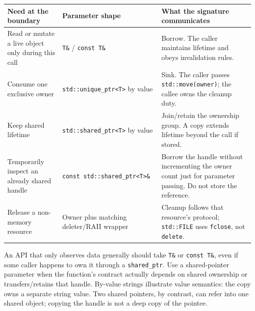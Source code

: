 {\def\LTcaptype{none} %
\begin{longtable}[]{@{}
  >{\raggedright\arraybackslash}p{}
  >{\raggedright\arraybackslash}p{}
  >{\raggedright\arraybackslash}p{}@{}}
\toprule\noalign{}
\begin{minipage}[b]{\linewidth}\raggedright
Need at the boundary
\end{minipage} & \begin{minipage}[b]{\linewidth}\raggedright
Parameter shape
\end{minipage} & \begin{minipage}[b]{\linewidth}\raggedright
What the signature communicates
\end{minipage} \\
\midrule\noalign{}
\endhead
\bottomrule\noalign{}
\endlastfoot
Read or mutate a live object only during this call & \texttt{T\&} / \texttt{const\ T\&} & Borrow. The caller maintains lifetime and obeys invalidation rules. \\
Consume one exclusive owner & \texttt{std::unique\_ptr\textless{}T\textgreater{}} by value & Sink. The caller passes \texttt{std::move(owner)}; the callee owns the cleanup duty. \\
Keep shared lifetime & \texttt{std::shared\_ptr\textless{}T\textgreater{}} by value & Join/retain the ownership group. A copy extends lifetime beyond the call if stored. \\
Temporarily inspect an already shared handle & \texttt{const\ std::shared\_ptr\textless{}T\textgreater{}\&} & Borrow the handle without incrementing the owner count just for parameter passing. Do not store the reference. \\
Release a non-memory resource & Owner plus matching deleter/RAII wrapper & Cleanup follows that resource's protocol; \texttt{std::FILE} uses \texttt{fclose}, not \texttt{delete}. \\
\end{longtable}
}

An API that only observes data generally should take \texttt{T\&} or \texttt{const\ T\&}, even if some caller happens to own it through a \texttt{shared\_ptr}. Use a shared-pointer parameter when the function's contract actually depends on shared ownership or transfers/retains that handle. By-value strings illustrate value semantics: the copy owns a separate string value. Two shared pointers, by contrast, can refer into one shared object; copying the handle is not a deep copy of the pointee.

